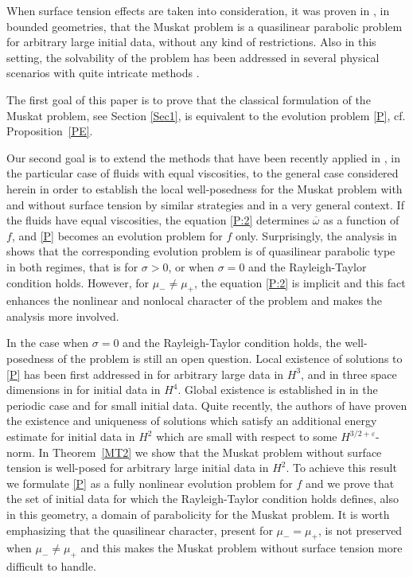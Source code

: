 \documentclass[11pt,reqno]{amsart}
\numberwithin{equation}{section}
\newcommand{\0}{\Omega}
\newcommand{\e}{\varepsilon}
\newcommand{\ov}{\overline}
\newcommand{\oo}{\ov\omega}
\numberwithin{equation}{section}
\begin{document}
When surface tension effects are taken into consideration, it was proven in \cite{EMW15, PS16, PS16x}, in bounded geometries, that the Muskat problem is a quasilinear parabolic problem for arbitrary large initial data, 
without  any kind of restrictions.
Also in this setting, the solvability of the problem has been addressed in several physical scenarios with quite intricate methods \cite{A14, FT03, HTY97,EMM12a, EM11a, T16}.

The first goal of this paper is to    prove that the classical formulation of the Muskat problem, see Section \ref{Sec1}, is equivalent to  the evolution problem \eqref{P}, cf. Proposition~\ref{PE}. 

Our second goal   is to extend the methods that have been recently applied in \cite{M16x}, in the particular case of fluids with equal viscosities, 
to the general case considered herein in order to establish the 
local well-posedness for the Muskat problem with and without surface tension by similar strategies and in a very general context.
If the fluids have equal viscosities, the equation  \eqref{P:2}  determines $\oo$ as a function of $f$,  and \eqref{P} becomes an evolution problem for $f$ only. 
Surprisingly, the analysis in  \cite{M16x} shows that the corresponding evolution problem is of  quasilinear parabolic type
in both regimes, that is for $\sigma>0$, or when $\sigma=0$ and the Rayleigh-Taylor condition holds.
However, for $\mu_-\neq \mu_+$, the equation \eqref{P:2} is  implicit and this fact enhances the nonlinear and nonlocal character of the problem and makes the analysis more involved.

In the case when $\sigma=0$ and the Rayleigh-Taylor condition holds, the  well-posedness of the problem is still an open question. 
Local existence of solutions to \eqref{P} has been first addressed  in \cite{CCG11} for arbitrary large  data in $H^3$, 
and in three space dimensions in \cite{CCG13b} for initial data in $H^4$. 
Global existence is established in  \cite{SCH04}  in the periodic case and for small initial data.
Quite recently, the authors of \cite{BCS16} have proven the existence and uniqueness of solutions which satisfy an additional energy estimate  for initial data in $H^2$ which are small with respect to some $H^{3/2+\e}$-norm.   
In Theorem~\ref{MT2} we show that the Muskat problem without surface tension is well-posed for arbitrary large initial data in $H^2$.
To achieve this result we formulate \eqref{P} as a fully nonlinear  evolution problem for $f$ and we prove that the set of initial data for which the Rayleigh-Taylor condition holds defines, also in this geometry,
a domain of parabolicity for the Muskat problem. 
It is worth emphasizing that the quasilinear character, present for $\mu_-=\mu_+$, is not preserved when $\mu_-\neq\mu_+$ and this makes the Muskat problem without surface tension more difficult to handle.
\end{document}
